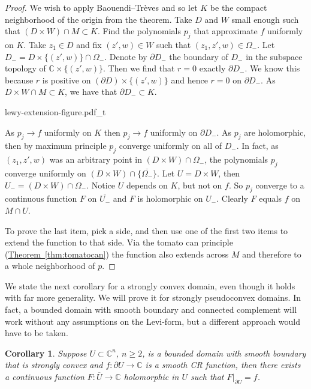 \documentclass[12pt,openany]{book}
\newcommand{\C}{{\mathbb{C}}}
\theoremstyle{plain}
\newtheorem{cor}[thm]{Corollary}
\theoremstyle{remark}
\theoremstyle{definition}
\theoremstyle{exercise}
\theoremstyle{example}
\newcommand{\thmref}[1]{\hyperref[#1]{Theorem~\ref*{#1}}}
\begin{document}
\begin{proof}
We wish to apply
Baouendi--Tr{\`e}ves and so let $K$ be the compact neighborhood of the
origin from the theorem.  Take $D$ and $W$ small enough such
that $(D \times W) \cap M \subset K$.
Find the polynomials $p_j$ that approximate $f$ uniformly on $K$.
Take $z_1 \in D$ and fix $(z',w) \in W$ such that
$(z_1,z',w) \in \Omega_-$.
Let
$D_- = D \times \{ (z',w) \} \cap \Omega_-$.
Denote by $\partial D_-$ the boundary of $D_-$ in the subspace topology
of $\C \times \{ (z',w) \}$.
Then we find that $r=0$ exactly $\partial D_-$.
We know this because $r$ is positive on $(\partial D) \times \{ (z',w) \}$
and hence $r=0$ on $\partial D_-$.
As $D \times W \cap M \subset K$, we have that $\partial D_- \subset K$.

\begin{center}
{lewy-extension-figure.pdf_t}
\end{center}

As $p_j \to f$ uniformly on $K$ then $p_j \to f$ uniformly on
$\partial D_-$.  As  $p_j$ are holomorphic, then by maximum
principle $p_j$ converge uniformly on all of $D_-$.  In fact, as $(z_1,z',w)$ was
an arbitrary point in $(D \times W) \cap \Omega_-$,
the polynomials $p_j$ converge uniformly on $(D \times W) \cap \{
\overline{\Omega_-} \}$.
%
Let $U = D \times W$, then $U_- = (D \times W) \cap \Omega_-$.  Notice 
$U$ depends on $K$, but not on $f$.
So $p_j$ converge to a continuous function $F$ on $\overline{U_-}$ and $F$
is holomorphic on
$U_-$.  Clearly $F$ equals $f$ on $M \cap U$.

To prove the last item, pick a side, and then use one of the first two
items to extend the function to that side.  Via the tomato can
principle (\thmref{thm:tomatocan}) the function also extends across $M$ and
therefore to a whole neighborhood of $p$.
\end{proof}

We state the next corollary for a strongly convex domain, even though it
holds with far more generality.  We will prove it for strongly pseudoconvex
domains.  In fact, a bounded domain with smooth
boundary and connected complement
will work without any assumptions on the Levi-form, but 
a different approach would have to be taken.

\begin{cor}
Suppose $U \subset \C^n$, $n \geq 2$, is a bounded domain with smooth boundary that is
strongly convex 
and $f \colon \partial U \to \C$ is a smooth CR function, then
there exists a continuous function $F \colon \overline{U} \to \C$
holomorphic in $U$
such that $F|_{\partial U} = f$.
\end{cor}
\end{document}
